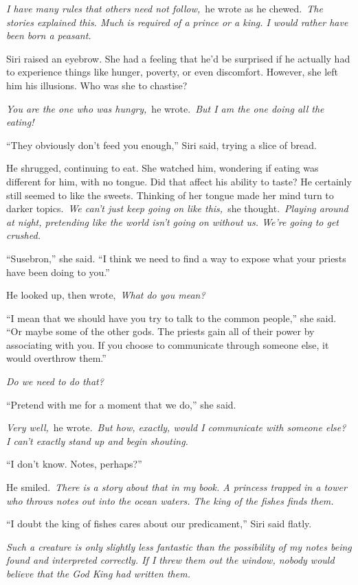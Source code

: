 \textit{I have many rules that others need not follow,}~he wrote as he chewed.~\textit{The stories explained this. Much is required of a prince or a king. I would rather have been born a peasant.}

Siri raised an eyebrow. She had a feeling that he’d be surprised if he actually had to experience things like hunger, poverty, or even discomfort. However, she left him his illusions. Who was she to chastise?

\textit{You are the one who was hungry,}~he wrote.~\textit{But I am the one doing all the eating!}

“They obviously don’t feed you enough,” Siri said, trying a slice of bread.

He shrugged, continuing to eat. She watched him, wondering if eating was different for him, with no tongue. Did that affect his ability to taste? He certainly still seemed to like the sweets. Thinking of her tongue made her mind turn to darker topics.~\textit{We can’t just keep going on like this,}~she thought.~\textit{Playing around at night, pretending like the world isn’t going on without us. We’re going to get crushed.}

“Susebron,” she said. “I think we need to find a way to expose what your priests have been doing to you.”

He looked up, then wrote,~\textit{What do you mean?}

“I mean that we should have you try to talk to the common people,” she said. “Or maybe some of the other gods. The priests gain all of their power by associating with you. If you choose to communicate through someone else, it would overthrow them.”

\textit{Do we need to do that?}

“Pretend with me for a moment that we do,” she said.

\textit{Very well,}~he wrote.~\textit{But how, exactly, would I communicate with someone else? I can’t exactly stand up and begin shouting.}

“I don’t know. Notes, perhaps?”

He smiled.~\textit{There is a story about that in my book. A princess trapped in a tower who throws notes out into the ocean waters. The king of the fishes finds them.}

“I doubt the king of fishes cares about our predicament,” Siri said flatly.

\textit{Such a creature is only slightly less fantastic than the possibility of my notes being found and interpreted correctly. If I threw them out the window, nobody would believe that the God King had written them.}


